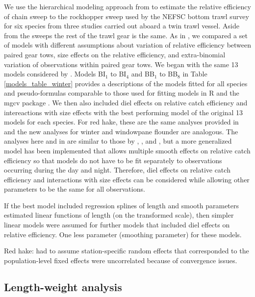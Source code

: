 \documentclass[]{article}
\begin{document}
We use the hierarchical modeling approach from \citet{miller13} to
estimate the relative efficiency of chain sweep to the rockhopper sweep
used by the NEFSC bottom trawl survey for six species from three studies
carried out aboard a twin trawl vessel. Aside from the sweeps the rest
of the trawl gear is the same. As in \citet{miller13}, we compared a set
of models with different assumptions about variation of relative
efficiency between paired gear tows, size effects on the relative
efficiency, and extra-binomial variation of observations within paired
gear tows. We began with the same 13 models considered by
\citet{miller13}. Models BI\(_1\) to BI\(_4\) and BB\(_1\) to BB\(_8\)
in Table \ref{models_table_winter} provides a descriptions of the models
fitted for all species and pseudo-formulas comparable to those used for
fitting models in R and the mgcv package \citep{R19, wood06}. We then
also included diel effects on relative catch efficiency and
intereactions with size effects with the best performing model of the
original 13 models for each species. For red hake, these are the same
analyses provided in \citet{milleretal20} and the new analyses for
winter and windowpane flounder are analogous. The analyses here and in
\citet{milleretal20} are similar to those by \citet{milleretal17a},
\citet{milleretal17b}, and \citet{milleretal18}, but a more generalized
model has been implemented that allows multiple smooth effects on
relative catch efficiency so that models do not have to be fit
separately to observations occurring during the day and night.
Therefore, diel effects on relative catch efficiency and interactions
with size effects can be considered while allowing other parameters to
be the same for all observations.

If the best model included regression splines of length and smooth
parameters estimated linear functions of length (on the transformed
scale), then simpler linear models were assumed for further models that
included diel effects on relative efficiency. One less parameter
(smoothing parameter) for these models.

Red hake: had to assume station-specific random effects that
corresponded to the population-level fixed effects were uncorrelated
because of convergence issues.

\hypertarget{length-weight-analysis}{%
\subsection{Length-weight analysis}\label{length-weight-analysis}}
\end{document}
